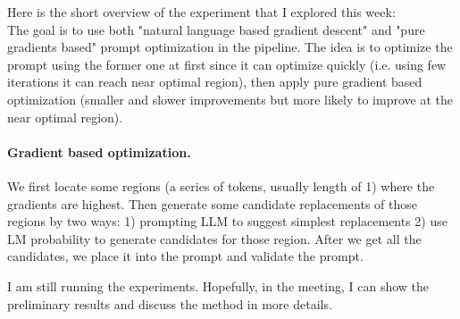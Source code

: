 \documentclass[12pt]{article}
\begin{document}
Here is the short overview of the experiment that I explored this week:\\

The goal is to use both "natural language based gradient descent" and "pure gradients based" prompt  optimization in the pipeline.
The idea is to optimize the prompt using the former one at first since it can optimize quickly (i.e. using few iterations it can reach near optimal region), 
then apply pure gradient based optimization (smaller and slower improvements but more likely to improve at the near optimal region).

\paragraph{Gradient based optimization.} We first locate some regions (a series of tokens, usually length of 1) where the gradients are highest.
Then generate some candidate replacements of those regions by two ways: 1) prompting LLM to suggest simplest replacements 2) use LM probability to generate candidates for those region.
After we get all the candidates, we place it into the prompt and validate the prompt.

I am still running the experiments. Hopefully, in the meeting, I can show the preliminary results and discuss the method in more details.


%   
%     
\end{document}
